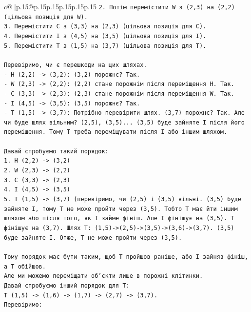 \documentclass{article}
\begin{document}
{\begin{supertabular}{c@{$\;$}|p{.15\linewidth}@{}p{.15\linewidth}p{.15\linewidth}p{.15\linewidth}p{.15\linewidth}p{.15\linewidth}}
{{{\texttt{2. Потім перемістити W з (2,3) на (2,2) (цільова позиція для W).} \\
\texttt{3. Перемістити C з (3,3) на (2,3) (цільова позиція для C).} \\
\texttt{4. Перемістити I з (4,5) на (3,5) (цільова позиція для I).} \\
\texttt{5. Перемістити T з (1,5) на (3,7) (цільова позиція для T).} \\
\\ 
\texttt{Перевіримо, чи є перешкоди на цих шляхах.} \\
\texttt{{-} H (2,2) {-}> (3,2): (3,2) порожнє? Так.} \\
\texttt{{-} W (2,3) {-}> (2,2): (2,2) стане порожнім після переміщення H. Так.} \\
\texttt{{-} C (3,3) {-}> (2,3): (2,3) стане порожнім після переміщення W. Так.} \\
\texttt{{-} I (4,5) {-}> (3,5): (3,5) порожнє? Так.} \\
\texttt{{-} T (1,5) {-}> (3,7): Потрібно перевірити шлях. (3,7) порожнє? Так. Але чи буде шлях вільним? (2,5), (3,5)... (3,5) буде зайняте I після його переміщення. Тому T треба переміщувати після I або іншим шляхом.} \\
\\ 
\texttt{Давай спробуємо такий порядок:} \\
\texttt{1. H (2,2) {-}> (3,2)} \\
\texttt{2. W (2,3) {-}> (2,2)} \\
\texttt{3. C (3,3) {-}> (2,3)} \\
\texttt{4. I (4,5) {-}> (3,5)} \\
\texttt{5. T (1,5) {-}> (3,7) (перевіримо, чи (2,5) і (3,5) вільні. (3,5) буде зайняте I, тому T не може пройти через (3,5). Тобто T має йти іншим шляхом або після того, як I займе фініш. Але I фінішує на (3,5). T фінішує на (3,7). Шлях T: (1,5){-}>(2,5){-}>(3,5){-}>(3,6){-}>(3,7). (3,5) буде зайняте I. Отже, T не може пройти через (3,5).} \\
\\ 
\texttt{Тому порядок має бути таким, щоб T пройшов раніше, або I зайняв фініш, а T обійшов.} \\
\texttt{Але ми можемо переміщати об'єкти лише в порожні клітинки.} \\
\texttt{Давай спробуємо інший порядок для T:} \\
\texttt{T (1,5) {-}> (1,6) {-}> (1,7) {-}> (2,7) {-}> (3,7).} \\
\texttt{Перевіримо:} \\
}}}
\end{supertabular}}
\end{document}
